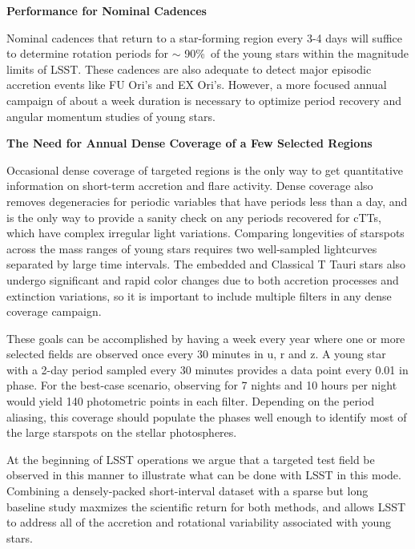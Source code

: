 {\bf Performance for Nominal Cadences}

Nominal cadences that return to a star-forming region every 3-4 days
will suffice to determine rotation periods for $\sim$ 90\%\ of the
young stars within the magnitude limits of LSST.
These cadences are also adequate to detect major episodic
accretion events like FU Ori's and EX Ori's. However, a more focused
annual campaign of about a week duration is necessary to optimize
period recovery and angular momentum studies of young stars.

{\bf The Need for Annual Dense Coverage of a Few Selected Regions}

Occasional dense coverage of targeted regions is the only way to
get quantitative information on short-term accretion and flare
activity.  Dense coverage also removes degeneracies
for periodic variables that have periods less than a day, and is
the only way to provide a sanity check on any periods recovered for
cTTs, which have complex irregular light variations.
Comparing longevities of starspots across the mass ranges of young
stars requires two well-sampled lightcurves separated by large
time intervals.  The embedded and Classical T Tauri stars also undergo
significant and rapid color changes due to both accretion processes
and extinction variations, so it is important
to include multiple filters in any dense coverage campaign. 

These goals can be accomplished by having a week every year where
one or more selected fields are observed once every 30 minutes in u, r and z.
A young star with a 2-day period sampled every 30 minutes provides a
data point every 0.01 in phase. For the best-case scenario, observing for 7 nights
and 10 hours per night would yield 140 photometric points in each filter.
Depending on the period aliasing, this coverage should populate the
phases well enough to identify most of the large starspots on the stellar photospheres.

At the beginning of LSST operations we argue that a targeted test field
be observed in this manner to illustrate what can be done with LSST in this mode.
Combining a densely-packed short-interval
dataset with a sparse but long baseline study maxmizes the scientific return
for both methods, and allows LSST to address all of the accretion and
rotational variability associated with young stars.




